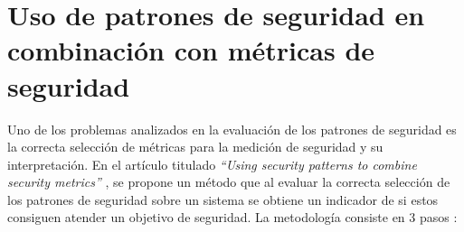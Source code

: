 \section{Uso de patrones de seguridad en combinación con métricas de seguridad}
%
%
%
Uno de los problemas analizados en la evaluación de los patrones de seguridad es la correcta selección de métricas para la medición de seguridad y su interpretación. En el artículo titulado \textit{``Using security patterns to combine security metrics''} \cite{HeyScaHuy08}, se propone un método que al evaluar la correcta selección de los patrones de seguridad sobre un sistema se obtiene un indicador de si estos consiguen atender un objetivo de seguridad. 
%
La metodología consiste en 3 pasos \cite{HeyScaHuy08}:
%

